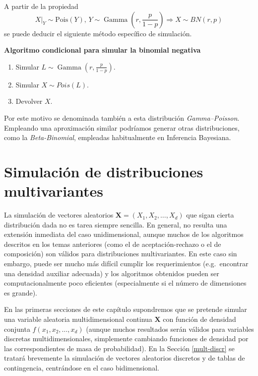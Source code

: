 \documentclass[
]{book}
\theoremstyle{break}
\theoremstyle{definition}
\theoremstyle{definition}
\theoremstyle{definition}
\theoremstyle{remark}
\begin{document}
A partir de la propiedad
\[X|_{Y} \sim \text{Pois}\left(  Y\right)  \text{, }Y \sim \operatorname{Gamma} \left( r, \frac{p}{1-p}\right)  \Rightarrow X \sim BN(r, p)\]
se puede deducir el siguiente método específico de simulación.

\textbf{Algoritmo condicional para simular la binomial negativa}

\begin{enumerate}
\def\labelenumi{\arabic{enumi}.}
\item
  Simular \(L \sim \operatorname{Gamma}\left( r, \frac{p}{1-p} \right)\).
\item
  Simular \(X \sim Pois \left( L\right)\).
\item
  Devolver \(X\).
\end{enumerate}

Por este motivo se denominada también a esta distribución \emph{Gamma--Poisson}. Empleando una aproximación similar podríamos generar otras distribuciones, como la \emph{Beta-Binomial}, empleadas habitualmente en Inferencia Bayesiana.

\hypertarget{simulaciuxf3n-de-distribuciones-multivariantes}{%
\chapter{Simulación de distribuciones multivariantes}\label{simulaciuxf3n-de-distribuciones-multivariantes}}

La simulación de vectores aleatorios \(\mathbf{X} =\left( X_1,X_2,\ldots,X_d\right)\) que sigan cierta distribución dada no es tarea siempre sencilla.
En general, no resulta una extensión inmediata del caso unidimensional,
aunque muchos de los algoritmos descritos en los temas anteriores (como el de aceptación-rechazo o el de composición) son válidos para distribuciones multivariantes.
En este caso sin embargo, puede ser mucho más difícil cumplir los requerimientos (e.g.~encontrar una densidad auxiliar adecuada) y los algoritmos obtenidos pueden ser computacionalmente poco eficientes (especialmente si el número de dimensiones es grande).

En las primeras secciones de este capítulo supondremos que se pretende simular una variable aleatoria multidimensional continua \(\mathbf{X}\) con función de densidad conjunta \(f\left( x_1, x_2, \ldots , x_d\right)\) (aunque muchos resultados serán válidos para variables discretas multidimensionales, simplemente cambiando funciones de densidad por las correspondientes de masa de probabilidad).
En la Sección \ref{mult-discr} se tratará brevemente la simulación de vectores aleatorios discretos y de tablas de contingencia, centrándose en el caso bidimensional.
\end{document}
